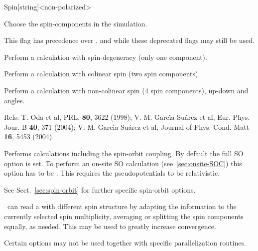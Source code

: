 

\begin{fdfentry}{Spin}[string]<non-polarized>
  
    Choose the spin-components in the simulation.
  
    \note This flag has precedence over ,  and
     while these deprecated flags may still be used.
    \begin{fdfoptions}
  
      Perform a calculation with spin-degeneracy (only one component).
  
      \option[polarized]%
      Perform a calculation with colinear spin (two spin components).
  
      Perform a calculation with non-colinear spin (4 spin components),
      up-down and angles.
  
      Refs: T. Oda et al, PRL, \textbf{80}, 3622 (1998);
      V. M. Garc\'{\i}a-Su\'arez et al, Eur. Phys. Jour. B \textbf{40}, 371 (2004);
      V. M. Garc\'{\i}a-Su\'arez et al, Journal of
      Phys: Cond. Matt \textbf{16}, 5453 (2004).
  
      Performs calculations including the spin-orbit coupling. By default the
      full SO option is set. To perform an on-site SO calculation (see~\ref{sec:onsite-SOC})
      this option has to be . This requires the
      pseudopotentials to be relativistic.
  
      See Sect.~\ref{sec:spin-orbit} for further specific spin-orbit options.
  
    \end{fdfoptions}
  
    \siesta\ can read a  with different spin structure by
    adapting the information to the currently selected spin
    multiplicity, averaging or splitting the spin components equally, as
    needed. This may be used to greatly increase convergence.
  
    Certain options may not be used together with specific
    parallelization routines.
  
  \end{fdfentry}
  
